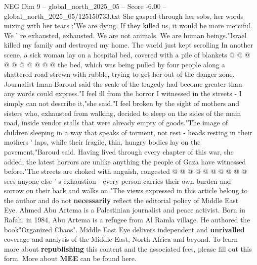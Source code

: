 \begin{textsample}{NEG Dim 9 – global\_north\_2025\_05 – Score -6.00 – global\_north\_2025\_05/125150733.txt}
She gasped through her sobs, her words mixing with her tears :"We are dying.
If they killed us, it would be more merciful.
We ' re exhausted, exhausted.
We are not animals.
We are human beings."Israel killed my family and destroyed my home.
The world just kept scrolling In another scene, a sick woman lay on a hospital bed, covered with a pile of blankets @ @ @ @ @ @ @ @ @ @ the bed, which was being pulled by four people along a shattered road strewn with rubble, trying to get her out of the danger zone.
Journalist Iman Baroud said the scale of the tragedy had become greater than any words could express."I feel ill from the horror I witnessed in the streets - I simply can not describe it,"she said."I feel broken by the sight of mothers and sisters who, exhausted from walking, decided to sleep on the sides of the main road, inside vendor stalls that were already empty of goods."The image of children sleeping in a way that speaks of torment, not rest - heads resting in their mothers ' laps, while their fragile, thin, hungry bodies lay on the pavement,"Baroud said.
Having lived through every chapter of this war, she added, the latest horrors are unlike anything the people of Gaza have witnessed before."The streets are choked with anguish, congested @ @ @ @ @ @ @ @ @ @ sees anyone else ' s exhaustion - every person carries their own burden and sorrow on their back and walks on."The views expressed in this article belong to the author and do not \textbf{necessarily} reflect the editorial policy of Middle East Eye.
Ahmed Abu Artema is a Palestinian journalist and peace activist.
Born in Rafah, in 1984, Abu Artema is a refugee from Al Ramla village.
He authored the book"Organized Chaos".
Middle East Eye delivers independent and \textbf{unrivalled} coverage and analysis of the Middle East, North Africa and beyond.
To learn more about \textbf{republishing} this content and the associated fees, please fill out this form.
More about \textbf{MEE} can be found here.

\end{textsample}
